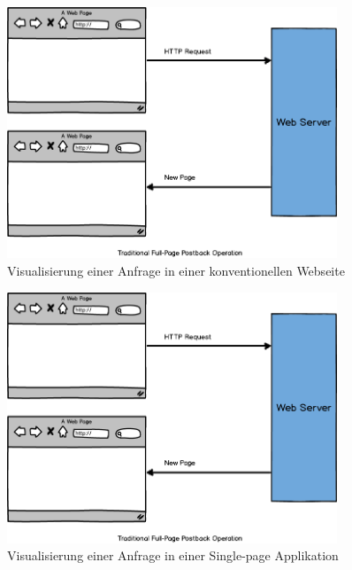 \begin{figure}[ht]
	\centering
  \includegraphics[width=0.88\textwidth]{images/requestHtml.png}
	\caption{Visualisierung einer Anfrage in einer konventionellen Webseite}
	\label{fig:requestHtml}
\end{figure}

\begin{figure}[ht]
	\centering
  \includegraphics[width=0.88\textwidth]{images/requestHtml.png}
	\caption{Visualisierung einer Anfrage in einer Single-page Applikation}
	\label{fig:requestXHtml}
\end{figure}


